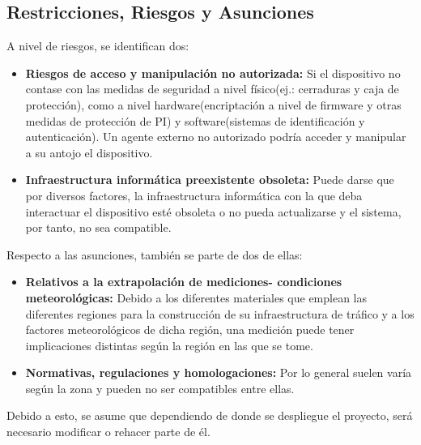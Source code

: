 \documentclass[
	a4paper, %
	12pt, %
]{CSSullivanBusinessReport}
\begin{document}
\begin{fullwidth}
\subsection{Restricciones, Riesgos y Asunciones}

A nivel de riesgos, se identifican dos: 
\begin{itemize}
    \item \textbf{Riesgos de acceso y manipulación no autorizada:} Si el dispositivo no contase con las medidas de seguridad a nivel físico(ej.: cerraduras y caja de protección), como a nivel hardware(encriptación a nivel de firmware y otras medidas de protección de PI) y software(sistemas de identificación y autenticación). Un agente externo no autorizado podría acceder y manipular a su antojo el dispositivo.
    \item \textbf{Infraestructura informática preexistente obsoleta:} Puede darse que por diversos factores, la infraestructura informática con la que deba interactuar el dispositivo esté obsoleta o no pueda actualizarse y el sistema, por tanto, no sea compatible.
\end{itemize}
 Respecto a las asunciones, también se parte de dos de ellas: 
 \begin{itemize}
     \item \textbf{Relativos a la extrapolación de mediciones- condiciones meteorológicas:}  Debido a los diferentes materiales que emplean las diferentes regiones para la construcción de su infraestructura de tráfico y a los factores meteorológicos de dicha región, una medición puede tener implicaciones distintas según la región en las que se tome.
     \item \textbf{Normativas, regulaciones y homologaciones:} Por lo general suelen varía según la zona y pueden no ser compatibles entre ellas.
 \end{itemize}
 Debido a esto, se asume que dependiendo de donde se despliegue el proyecto, será necesario modificar o rehacer parte de él.




\end{fullwidth}
\end{document}
